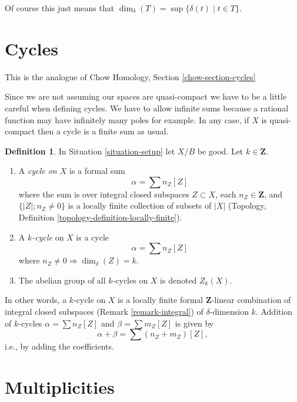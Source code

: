 \documentclass{stacks-project}
\theoremstyle{plain}
\theoremstyle{definition}
\newtheorem{definition}[subsection]{Definition}
\theoremstyle{remark}
\numberwithin{equation}{subsection}
\begin{document}
\noindent
Of course this just means that
$\dim_\delta(T) = \sup \{\delta(t) \mid t \in T\}$.







\section{Cycles}
\label{section-cycles}

\noindent
This is the analogue of Chow Homology, Section \ref{chow-section-cycles}

\medskip\noindent
Since we are not assuming our spaces are quasi-compact we have
to be a little careful when defining cycles. We have to allow
infinite sums because a rational function may have infinitely many
poles for example. In any case, if $X$ is quasi-compact then a
cycle is a finite sum as usual.

\begin{definition}
\label{definition-cycles}
In Situation \ref{situation-setup} let $X/B$ be good.
Let $k \in \mathbf{Z}$.
\begin{enumerate}
\item A {\it cycle on $X$} is a formal sum
$$
\alpha = \sum n_Z [Z]
$$
where the sum is over integral closed subspaces $Z \subset X$,
each $n_Z \in \mathbf{Z}$, and
$\{|Z|; n_Z \not = 0\}$ is a locally finite
collection of subsets of $|X|$
(Topology, Definition \ref{topology-definition-locally-finite}).
\item A {\it $k$-cycle} on $X$ is
a cycle
$$
\alpha = \sum n_Z [Z]
$$
where $n_Z \not = 0 \Rightarrow \dim_\delta(Z) = k$.
\item The abelian group of all $k$-cycles on $X$ is denoted $Z_k(X)$.
\end{enumerate}
\end{definition}

\noindent
In other words, a $k$-cycle on $X$ is a locally finite formal
$\mathbf{Z}$-linear combination of integral closed subspaces
(Remark \ref{remark-integral}) of $\delta$-dimension $k$.
Addition of $k$-cycles $\alpha = \sum n_Z[Z]$ and
$\beta = \sum m_Z[Z]$ is given by
$$
\alpha + \beta = \sum (n_Z + m_Z)[Z],
$$
i.e., by adding the coefficients.




\section{Multiplicities}
\label{section-multiplicities}
\end{document}
